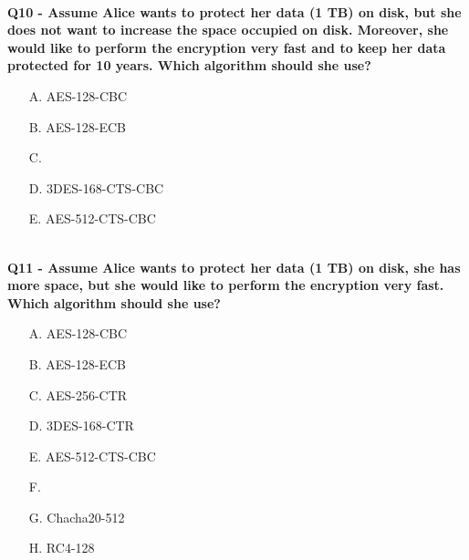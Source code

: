\textbf{\\Q10 - Assume Alice wants to protect her data (1 TB) on disk, but she does not want to increase the space occupied on disk. Moreover, she would like to perform the encryption very fast and to keep her data protected for 10 years. Which algorithm should she use?}
\begin{enumerate}
    \item[A.] AES-128-CBC
    \item[B.] AES-128-ECB
    \item[C.] 
    \item[D.] 3DES-168-CTS-CBC
    \item[E.] AES-512-CTS-CBC
\end{enumerate}

\textbf{\\Q11 - Assume Alice wants to protect her data (1 TB) on disk, she has more space, but she would like to perform the encryption very fast. Which algorithm should she use?}
\begin{enumerate}
    \item[A.] AES-128-CBC
    \item[B.] AES-128-ECB
    \item[C.] AES-256-CTR
    \item[D.] 3DES-168-CTR
    \item[E.] AES-512-CTS-CBC
    \item[F.] 
    \item[G.] Chacha20-512
    \item[H.] RC4-128
\end{enumerate}

